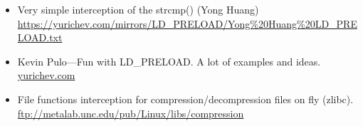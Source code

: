 \begin{itemize}

\item
Very simple interception of the strcmp() (Yong Huang) 
\url{https://yurichev.com/mirrors/LD_PRELOAD/Yong%20Huang%20LD_PRELOAD.txt}

\item
Kevin Pulo---Fun with LD\_PRELOAD. A lot of examples and ideas.
\href{http://yurichev.com/mirrors/LD_PRELOAD/lca2009.pdf}{yurichev.com}

\item
File functions interception for compression/decompression files on fly (zlibc). \url{ftp://metalab.unc.edu/pub/Linux/libs/compression}

\end{itemize}
